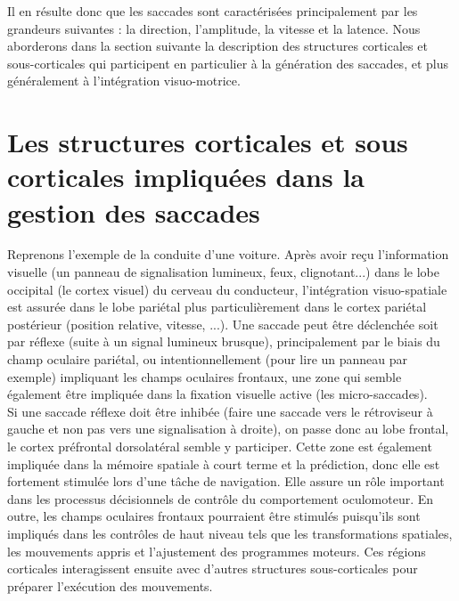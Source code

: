 Il en résulte donc que les saccades sont caractérisées principalement par les grandeurs suivantes : la direction, l'amplitude, la vitesse et la latence. Nous aborderons dans la section suivante la description des structures corticales et sous-corticales qui participent en particulier à la génération des saccades, et plus généralement à l'intégration visuo-motrice.

\section{Les structures corticales et sous corticales impliquées dans la gestion des saccades}


Reprenons l'exemple de la conduite d'une voiture. Après avoir reçu l'information visuelle (un panneau de signalisation lumineux, feux, clignotant...) dans le lobe occipital (le cortex visuel) du cerveau du conducteur, l'intégration visuo-spatiale est assurée dans le lobe pariétal plus particulièrement dans le cortex pariétal postérieur (position relative, vitesse, ...). Une saccade peut être déclenchée soit par réflexe (suite à un signal lumineux brusque), principalement par le biais du champ oculaire pariétal, ou intentionnellement (pour lire un panneau par exemple) impliquant les champs oculaires frontaux, une zone qui semble également être impliquée dans la fixation visuelle active (les micro-saccades).\\

Si une saccade réflexe doit être inhibée (faire une saccade vers le rétroviseur à gauche et non pas vers une signalisation à droite), on passe donc au lobe frontal, le cortex préfrontal dorsolatéral semble y participer. Cette zone est également impliquée dans la mémoire spatiale à court terme et la prédiction, donc elle est fortement stimulée lors d'une tâche de navigation. Elle assure un rôle important dans les processus décisionnels de contrôle du comportement oculomoteur. En outre, les champs oculaires frontaux pourraient être stimulés puisqu'ils sont impliqués dans les contrôles de haut niveau tels que les transformations spatiales, les mouvements appris et l'ajustement des programmes moteurs. Ces régions corticales interagissent ensuite avec d'autres structures sous-corticales pour préparer l'exécution des mouvements.\\


